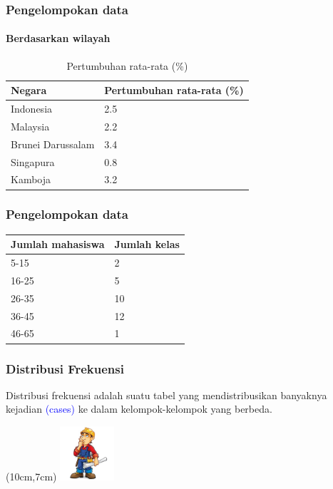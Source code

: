\documentclass[main.tex]{subfiles}
\begin{document}
\begin{frame}[c]
	\frametitle{Pengelompokan  data}
	\framesubtitle{Berdasarkan wilayah}
	\begin{table}[htb]
		\caption{Pertumbuhan rata-rata (\%)}
		\begin{tabular}{ll}
			\hline
			Negara             &  Pertumbuhan rata-rata (\%)  \\
			\hline
			Indonesia          &  2.5  \\
			Malaysia           &  2.2  \\
			Brunei Darussalam  &  3.4  \\
			Singapura          &  0.8  \\
			Kamboja            &  3.2  \\
		\end{tabular}
	\end{table}
\end{frame}

\begin{frame}[c]
	\frametitle{Pengelompokan data}
	\begin{tabular}{ll}
		\hline
		Jumlah mahasiswa  &  Jumlah kelas  \\
		\hline
		5-15              &  2  \\
		16-25             &  5  \\
		26-35             &  10  \\
		36-45             &  12  \\
		46-65             &  1  \\
		\hline
	\end{tabular}
\end{frame}

\begin{frame}[c]
	\frametitle{Distribusi Frekuensi}

	{\large Distribusi frekuensi} adalah suatu tabel yang mendistribusikan banyaknya {\large kejadian \textcolor{blue}{
				(cases)}} ke dalam kelompok-kelompok yang berbeda.

	\begin{textblock*}{2cm}(10cm,7cm) %
		\includegraphics[width=2cm]{figures/cons}
	\end{textblock*}


\end{frame}
\end{document}
